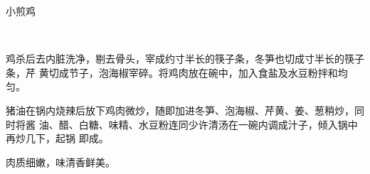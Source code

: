 \begin{recipe}{小煎鸡}

\ingredients

\\

\cooking

鸡杀后去内脏洗净，剔去骨头，宰成约寸半长的筷子条，冬笋也切成寸半长的筷子条，芹
黄切成节子，泡海椒宰碎。将鸡肉放在碗中，加入食盐及水豆粉拌和均匀。

猪油在锅内烧辣后放下鸡肉微炒，随即加进冬笋、泡海椒、芹黄、姜、葱稍炒，同时将酱
油、醋、白糖、味精、水豆粉连同少许清汤在一碗内调成汁子，倾入锅中再炒几下，起锅
即成。

\notes

肉质细嫩，味清香鲜美。

\end{recipe}

